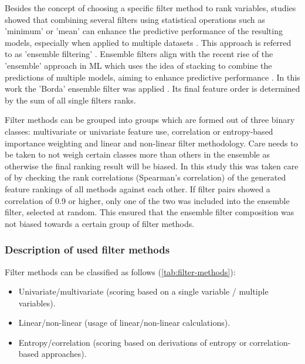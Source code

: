 \documentclass[final]{IEEEtran}
\begin{document}
Besides the concept of choosing a specific filter method to rank variables, studies showed that combining several filters using statistical operations such as 'minimum' or 'mean' can enhance the predictive performance of the resulting models, especially when applied to multiple datasets \cite{abeel2010, drotar2017a}.
This approach is referred to as 'ensemble filtering' \cite{dietterich2000}.
Ensemble filters align with the recent rise of the 'ensemble' approach in ML which uses the idea of stacking to combine the predictions of multiple models, aiming to enhance predictive performance \cite{polikar2012, feurer2015, bolon-canedo2019}.
In this work the 'Borda' ensemble filter was applied \cite{drotar2017a}.
Its final feature order is determined by the sum of all single filters ranks.

Filter methods can be grouped into groups which are formed out of three binary classes: multivariate or univariate feature use, correlation or entropy-based importance weighting and linear and non-linear filter methodology.
Care needs to be taken to not weigh certain classes more than others in the ensemble as otherwise the final ranking result will be biased.
In this study this was taken care of by checking the rank correlations (Spearman's correlation) of the generated feature rankings of all methods against each other.
If filter pairs showed a correlation of 0.9 or higher, only one of the two was included into the ensemble filter, selected at random.
This ensured that the ensemble filter composition was not biased towards a certain group of filter methods.

\subsubsection{Description of used filter methods}

Filter methods can be classified as follows (\autoref{tab:filter-methods}):

\begin{itemize}
	\item Univariate/multivariate (scoring based on a single variable / multiple variables).
	\item Linear/non-linear (usage of linear/non-linear calculations).
	\item Entropy/correlation (scoring based on derivations of entropy or correlation-based approaches).
\end{itemize}
\end{document}
